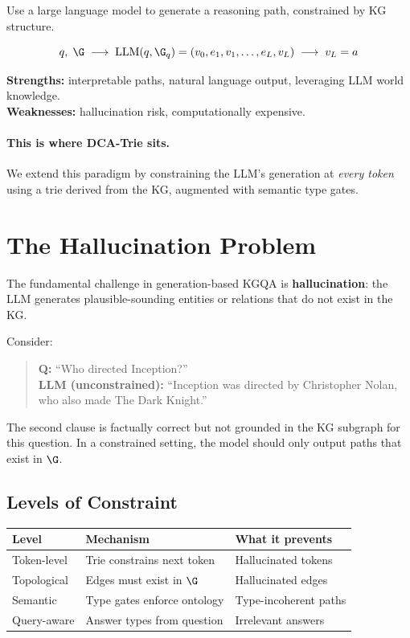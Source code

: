 \documentclass[11pt,a4paper]{article}
\begin{document}
Use a large language model to generate a reasoning path, constrained by
KG structure.

\[
  q,\; \G \;\longrightarrow\;
  \text{LLM}(q, \G_q) = (v_0, e_1, v_1, \ldots, e_L, v_L)
  \;\longrightarrow\; v_L = a
\]

\textbf{Strengths:} interpretable paths, natural language output,
leveraging LLM world knowledge.\\
\textbf{Weaknesses:} hallucination risk, computationally expensive.

\paragraph{This is where DCA-Trie sits.}  We extend this paradigm by
constraining the LLM's generation at \emph{every token} using a trie
derived from the KG, augmented with semantic type gates.

\section{The Hallucination Problem}

The fundamental challenge in generation-based KGQA is
\textbf{hallucination}: the LLM generates plausible-sounding entities
or relations that do not exist in the KG.

Consider:
\begin{quote}
  \textbf{Q:} ``Who directed Inception?''\\
  \textbf{LLM (unconstrained):} ``Inception was directed by
  Christopher Nolan, who also made The Dark Knight.''
\end{quote}

The second clause is factually correct but not grounded in the KG
subgraph for this question.  In a constrained setting, the model should
only output paths that exist in $\G$.

\subsection{Levels of Constraint}

\begin{center}
\begin{tabular}{@{}lll@{}}
\toprule
  Level & Mechanism & What it prevents \\
\midrule
  Token-level  & Trie constrains next token     & Hallucinated tokens \\
  Topological  & Edges must exist in $\G$        & Hallucinated edges \\
  Semantic     & Type gates enforce ontology     & Type-incoherent paths \\
  Query-aware  & Answer types from question      & Irrelevant answers \\
\bottomrule
\end{tabular}
\end{center}
\end{document}
